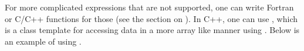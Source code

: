 \documentclass[letterpaper,10pt,english]{sphinxmanual}
\begin{document}
\begin{sphinxVerbatim}[commandchars=\\\{\}]
    
   
\end{sphinxVerbatim}
\label{\detokenize{Basics:sec-basics-array4}}
\sphinxAtStartPar
For more complicated expressions that are not supported, one can write
Fortran or C/C++ functions for those (see the section
on {\hyperref[\detokenize{Basics:sec-basics-fortran}]{}}).  In C++, one can use ,
which is a class template for accessing  data in a more
array like manner using .  Below is an example of
using .
\end{document}
